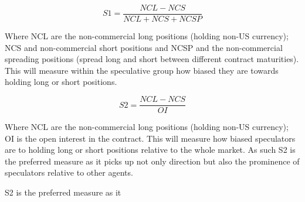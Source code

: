 \documentclass[ijfs,article,submit,oneauthor,pdftex,10pt,a4paper]{mdpi}
\begin{document}
\begin{equation}
S1 = \frac{NCL - NCS}{NCL + NCS + NCSP}
\end{equation} 

Where NCL are the non-commercial long positions (holding non-US currency); NCS and non-commercial short positions and NCSP and the non-commercial spreading positions (spread long and short between different contract maturities). This will measure within the speculative group how biased they are towards holding long or short positions. 

\begin{equation}
S2 = \frac{NCL - NCS}{OI}
\end{equation} 

Where NCL are the non-commercial long positions (holding non-US currency); OI is the open interest in the contract. This will measure how biased speculators are to holding long or short positions relative to the whole market.  As such S2 is the preferred measure as it picks up not only direction but also the prominence of speculators relative to other agents. 

S2 is the preferred measure as it 
\end{document}

